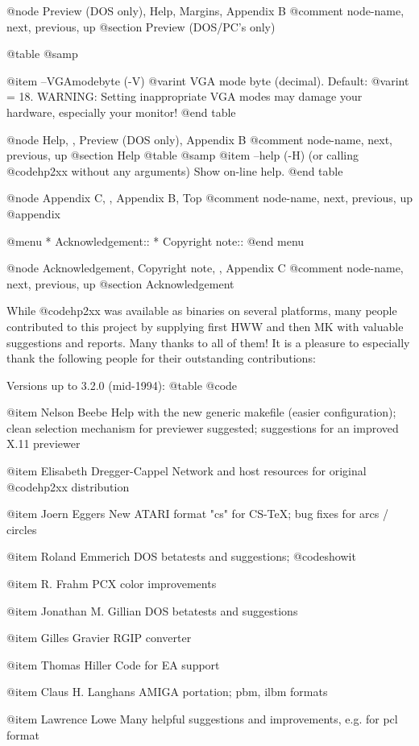 @node Preview (DOS only), Help, Margins, Appendix B
@comment  node-name,  next,  previous,  up
@section  Preview (DOS/PC's only)

@table @samp

@item --VGAmodebyte (-V) @var{int}
VGA mode byte (decimal). Default: @var{int} = 18.
WARNING: Setting inappropriate VGA modes may damage your hardware,
especially your monitor!
@end table


@node Help, , Preview (DOS only), Appendix B
@comment  node-name,  next,  previous,  up
@section  Help
@table @samp
@item --help (-H)
(or calling @code{hp2xx} without any arguments)  Show on-line help.
@end table



@node Appendix C, , Appendix B, Top
@comment  node-name,  next,  previous,  up
@appendix

@menu
* Acknowledgement::
* Copyright note::
@end menu


@node Acknowledgement, Copyright note, , Appendix C
@comment  node-name,  next,  previous,  up
@section Acknowledgement

While @code{hp2xx} was available as binaries on several platforms,
many people contributed to this project by supplying first HWW and then MK
with valuable suggestions and reports. Many thanks to all of them!
It is a pleasure to especially thank the following people for their
outstanding contributions:

Versions up to 3.2.0 (mid-1994):
@table @code

@item Nelson Beebe
Help with the new generic makefile (easier configuration);
clean selection mechanism for previewer suggested;
suggestions for an improved X.11 previewer

@item Elisabeth Dregger-Cappel
Network and host resources for original @code{hp2xx} distribution

@item Joern Eggers
New ATARI format "cs" for CS-TeX; bug fixes for arcs / circles

@item Roland Emmerich
DOS betatests and suggestions; @code{showit}

@item R. Frahm
PCX color improvements

@item Jonathan M. Gillian
DOS betatests and suggestions

@item Gilles Gravier
RGIP converter

@item Thomas Hiller
Code for EA support

@item Claus H. Langhans
AMIGA portation; pbm, ilbm formats

@item Lawrence Lowe
Many helpful suggestions and improvements, e.g. for pcl format

